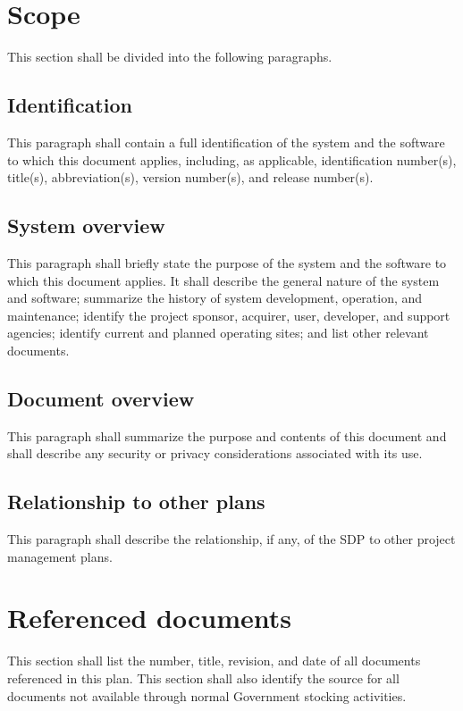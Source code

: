 \section{Scope}

This section shall be divided into the following paragraphs.

\subsection{Identification}

This paragraph shall contain a full identification of the system and the
software to which this document applies, including, as applicable,
identification number(s), title(s), abbreviation(s), version number(s),
and release number(s).

\subsection{System overview}

This paragraph shall briefly state the purpose of the system and the
software to which this document applies. It shall describe the general
nature of the system and software; summarize the history of system
development, operation, and maintenance; identify the project sponsor,
acquirer, user, developer, and support agencies; identify current and
planned operating sites; and list other relevant documents.

\subsection{Document overview}

This paragraph shall summarize the purpose and contents of this document
and shall describe any security or privacy considerations associated
with its use.

\subsection{Relationship to other plans}

This paragraph shall describe the relationship, if any, of the SDP to
other project management plans.

\section{Referenced documents}

This section shall list the number, title, revision, and date of all
documents referenced in this plan. This section shall also identify the
source for all documents not available through normal Government
stocking activities.


